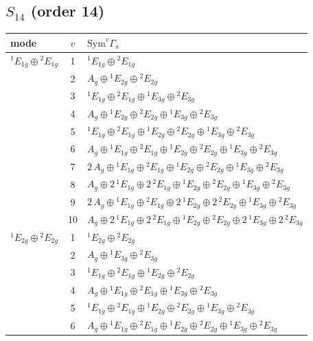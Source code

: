 \documentclass[11pt]{article}
\begin{document}
\subsection*{$S_{14}$ \quad (order 14)}
\begin{longtable}{l c p{}}
\hline mode & $v$ & $\mathrm{Sym}^v\Gamma_s$\\ \hline\endhead
${}^{1}E_{1g}\oplus {}^{2}E_{1g}$ & 1 & ${}^{1}E_{1g}\oplus {}^{2}E_{1g}$\\
 & 2 & $A_{g}\oplus {}^{1}E_{2g}\oplus {}^{2}E_{2g}$\\
 & 3 & ${}^{1}E_{1g}\oplus {}^{2}E_{1g}\oplus {}^{1}E_{3g}\oplus {}^{2}E_{3g}$\\
 & 4 & $A_{g}\oplus {}^{1}E_{2g}\oplus {}^{2}E_{2g}\oplus {}^{1}E_{3g}\oplus {}^{2}E_{3g}$\\
 & 5 & ${}^{1}E_{1g}\oplus {}^{2}E_{1g}\oplus {}^{1}E_{2g}\oplus {}^{2}E_{2g}\oplus {}^{1}E_{3g}\oplus {}^{2}E_{3g}$\\
 & 6 & $A_{g}\oplus {}^{1}E_{1g}\oplus {}^{2}E_{1g}\oplus {}^{1}E_{2g}\oplus {}^{2}E_{2g}\oplus {}^{1}E_{3g}\oplus {}^{2}E_{3g}$\\
 & 7 & $2\,A_{g}\oplus {}^{1}E_{1g}\oplus {}^{2}E_{1g}\oplus {}^{1}E_{2g}\oplus {}^{2}E_{2g}\oplus {}^{1}E_{3g}\oplus {}^{2}E_{3g}$\\
 & 8 & $A_{g}\oplus 2\,{}^{1}E_{1g}\oplus 2\,{}^{2}E_{1g}\oplus {}^{1}E_{2g}\oplus {}^{2}E_{2g}\oplus {}^{1}E_{3g}\oplus {}^{2}E_{3g}$\\
 & 9 & $2\,A_{g}\oplus {}^{1}E_{1g}\oplus {}^{2}E_{1g}\oplus 2\,{}^{1}E_{2g}\oplus 2\,{}^{2}E_{2g}\oplus {}^{1}E_{3g}\oplus {}^{2}E_{3g}$\\
 & 10 & $A_{g}\oplus 2\,{}^{1}E_{1g}\oplus 2\,{}^{2}E_{1g}\oplus {}^{1}E_{2g}\oplus {}^{2}E_{2g}\oplus 2\,{}^{1}E_{3g}\oplus 2\,{}^{2}E_{3g}$\\
\hline
${}^{1}E_{2g}\oplus {}^{2}E_{2g}$ & 1 & ${}^{1}E_{2g}\oplus {}^{2}E_{2g}$\\
 & 2 & $A_{g}\oplus {}^{1}E_{3g}\oplus {}^{2}E_{3g}$\\
 & 3 & ${}^{1}E_{1g}\oplus {}^{2}E_{1g}\oplus {}^{1}E_{2g}\oplus {}^{2}E_{2g}$\\
 & 4 & $A_{g}\oplus {}^{1}E_{1g}\oplus {}^{2}E_{1g}\oplus {}^{1}E_{3g}\oplus {}^{2}E_{3g}$\\
 & 5 & ${}^{1}E_{1g}\oplus {}^{2}E_{1g}\oplus {}^{1}E_{2g}\oplus {}^{2}E_{2g}\oplus {}^{1}E_{3g}\oplus {}^{2}E_{3g}$\\
 & 6 & $A_{g}\oplus {}^{1}E_{1g}\oplus {}^{2}E_{1g}\oplus {}^{1}E_{2g}\oplus {}^{2}E_{2g}\oplus {}^{1}E_{3g}\oplus {}^{2}E_{3g}$\\

\end{longtable}
\end{document}
